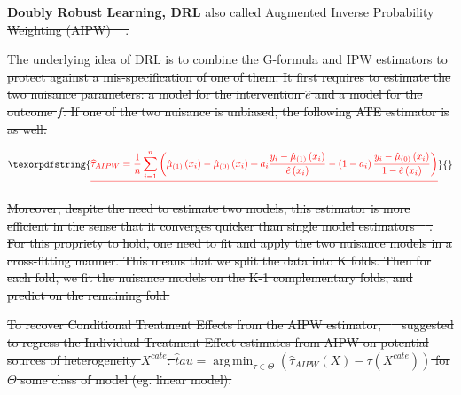 \documentclass[10pt,letterpaper]{article}
\DeclareMathOperator*{\argmin}{arg\,min}
\providecommand{\DIFdeltex}[1]{{\protect\color{red}\sout{#1}}}                      %
\providecommand{\DIFdel}[1]{\texorpdfstring{\DIFdeltex{#1}}{}} %
\begin{document}
\textbf{\DIFdel{Doubly Robust Learning, DRL}} %
\DIFdel{also called Augmented Inverse
  Probability Weighting (AIPW) \mbox{%
    \cite{robins1994estimation}}\hskip0pt%
  .
}%

\DIFdel{The underlying idea of DRL is to combine the G-formula and IPW estimators to
  protect against a mis-specification of one of them. It first requires to
  estimate the two nuisance parameters: a model for the intervention $\hat{e}$
  and a model for the outcome $f$. If one of the two nuisance is unbiased, the
  following ATE estimator is as well:
}%

\begin{displaymath}\DIFdel{\begin{aligned} \widehat{\tau}_{A I P W}=\frac{1}{n}
      \sum_{i=1}^{n}\left(\hat \mu_{(1)}\left(x_{i}\right)-\hat \mu_{(0)}\left(x_{i}\right)+a_{i}
      \frac{y_{i}-\hat \mu_{(1)}\left(x_{i}\right)}{\hat{e}\left(x_{i}\right)}-\left(1-a_{i}\right)
      \frac{y_{i}-\hat \mu_{(0)}\left(x_{i}\right)}{1-\hat{e}\left(x_{i}\right)}\right)
    \end{aligned}}\end{displaymath}%

\DIFdel{Moreover, despite the need to estimate two models, this estimator is more
  efficient in the sense that it converges quicker than single model estimators
  \mbox{%
    \cite{wager2020stats}}\hskip0pt%
  . For this propriety to hold, one need to fit and apply
  the two nuisance models in a cross-fitting manner. This means that we split
  the data into K folds. Then for each fold, we fit the nuisance models on the
  K-1 complementary folds, and predict on the remaining fold.
}%

\DIFdel{To recover Conditional Treatment Effects from the AIPW estimator,
  \mbox{%
    \cite{foster2019orthogonal} }\hskip0pt%
  suggested to regress the Individual Treatment
  Effect estimates from AIPW on potential sources of heterogeneity $X^{cate}$:
  $\hat tau = \argmin_{\tau \in \Theta} (\hat \tau_{AIPW}(X) - \tau(X^{cate}))$
  for $\Theta$ some class of model (eg. linear model).}%
\end{document}
